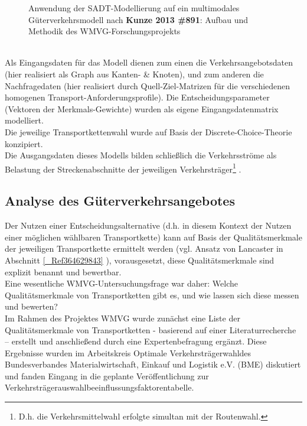 \begin{figure}[htbp]
  \centering
  \caption{ Anwendung der SADT-Modellierung auf ein multimodales Güterverkehrsmodell nach \textbf{{Kunze 2013 \#891}}: Aufbau und Methodik des WMVG-Forschungsprojekts}
  \label{_Ref364024552}
\end{figure}
~\\
Als Eingangsdaten für das Modell dienen zum einen die Verkehrsangebotsdaten (hier realisiert als Graph aus Kanten- \& Knoten), und zum anderen die Nachfragedaten (hier realisiert durch Quell-Ziel-Matrizen für die verschiedenen homogenen Transport-Anforderungsprofile). Die Entscheidungsparameter (Vektoren der Merkmals-Gewichte) wurden als eigene Eingangsdatenmatrix modelliert.~\\
Die jeweilige Transportkettenwahl wurde auf Basis der Discrete-Choice-Theorie konzipiert.~\\
Die Ausgangsdaten dieses Modells bilden schließlich die Verkehrsströme als Belastung der Streckenabschnitte der jeweiligen Verkehrsträger\footnote{%
 D.h. die Verkehrsmittelwahl erfolgte simultan mit der Routenwahl.
}%
.~\\


% 
\subsection{Analyse des Güterverkehrsangebotes}
\label{_Ref364387375}
\label{_Toc365801600}
\label{_Toc366766099}
\label{_Toc366775293}
Der Nutzen einer Entscheidungsalternative (d.h. in diesem Kontext der Nutzen einer möglichen wählbaren Transportkette) kann auf Basis der Qualitätsmerkmale der jeweiligen Transportkette ermittelt werden (vgl. Ansatz von Lancaster in Abschnitt \autoref{_Ref364629843} ), vorausgesetzt, diese Qualitätsmerkmale sind explizit benannt und bewertbar.~\\
Eine wesentliche WMVG-Untersuchungsfrage war daher: \glqq Welche Qualitätsmerkmale von Transportketten gibt es, und wie lassen sich diese messen und bewerten?\grqq ~\\
Im Rahmen des Projektes WMVG wurde zunächst eine Liste der Qualitätsmerkmale von Transportketten - basierend auf einer Literaturrecherche – erstellt und anschließend durch eine Expertenbefragung ergänzt. Diese Ergebnisse wurden im Arbeitskreis \glqq Optimale Verkehrsträgerwahl\grqq  des Bundesverbandes Materialwirtschaft, Einkauf und Logistik e.V. (BME) diskutiert und fanden Eingang in die geplante Veröffentlichung zur \glqq Verkehrsträgerauswahlbeeinflussungsfaktorentabelle.~\\


